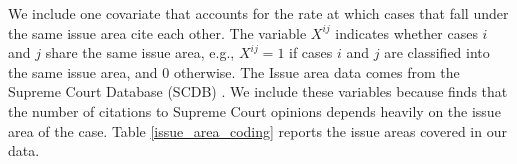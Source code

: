 \documentclass[headsepline=true, abstracton]{scrartcl}
\begin{document}

We include one covariate that accounts for the rate at which cases that fall under the same issue area cite each other. The variable $X^{ij}$ indicates whether cases $i$ and $j$ share the same issue area, e.g., $X^{ij}=1$ if cases $i$ and $j$ are classified into the same issue area, and $0$ otherwise. The Issue area data comes from the Supreme Court Database (SCDB) \citep{spaeth2014supreme}. We include these variables because \citet{cross2010determinants} finds that the number of citations to Supreme Court opinions depends heavily on the issue area of the case. Table \ref{issue_area_coding} reports the issue areas covered in our data.

\end{document}

